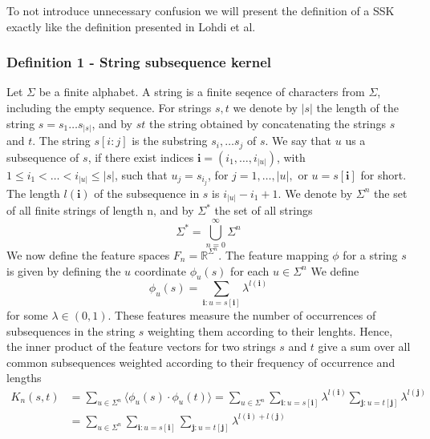 To not introduce unnecessary confusion we will present the definition of a SSK exactly like the definition presented in Lohdi et al. 

\subsubsection*{Definition 1 - String subsequence kernel}
Let $ \Sigma $ be a finite alphabet. A string is a finite seqence of characters from $ \Sigma $, including the empty sequence. For strings $s,t$ we denote by $|s|$ the length of the string $ s = s_1 \dots s_{|s|} $, and by $ st $ the string obtained by concatenating the strings $ s $ and $ t $. The string $ s[i:j] $ is the substring $ s_i, \dots s_j $ of $ s $. We say that $ u $ us a subsequence of $ s $, if there exist indices $ \boldsymbol{i} = (i_1, \dots, i_{|u|}) $, with $ 1 \leq i_1 < \dots < i_{|u|} \leq |s| $, such that $ u_j = s_{i_{j}}$, for $ j = 1, \dots, |u|, $ or $ u = s[\boldsymbol{i}] $ for short. The length $ l(\boldsymbol{i}) $ of the subsequence in $ s $ is $ i_{|u|} - i_1 +1 $. We denote by $ \Sigma^n $ the set of all finite strings of length n, and by $ \Sigma^* $ the set of all strings 
\begin{equation}\label{eq:all_Strings}
\Sigma^* = \bigcup^{\infty}_{n=0}\Sigma^n
\end{equation}
We now define the feature spaces $ F_n = \mathbb{R}^{\Sigma^{n}} $. The feature mapping $ \phi $ for a string $ s $ is given by defining the $ u $ coordinate $ \phi_u(s) $ for each $u \in \Sigma^n  $ We define 
\begin{equation}
\phi_u(s) = \sum_{\boldsymbol{i}:u=s[\boldsymbol{i}]} \lambda^{l(\boldsymbol{i})}
\end{equation}
for some $ \lambda \in (0,1) $. These features measure the number of occurrences of subsequences in the string $ s $ weighting them according to their lenghts. Hence, the inner product of the feature vectors for two strings $ s $ and $ t $ give a sum over all common subsequences weighted according to their frequency of occurrence and lengths
\begin{align*}\label{key}
K_n(s,t) &= \sum_{u\in\Sigma^n} \langle \phi_u(s) \cdot \phi_u(t) \rangle = \sum_{u \in \Sigma^n} \sum_{\boldsymbol{i}:u=s[\boldsymbol{i}]} \lambda^{l(\boldsymbol{i})} \sum_{\boldsymbol{j}:u=t[\boldsymbol{j}]} \lambda^{l(\boldsymbol{j})} \\
& =  \sum_{u \in \Sigma^n} \sum_{\boldsymbol{i}:u=s[\boldsymbol{i}]}  \sum_{\boldsymbol{j}:u=t[\boldsymbol{j}]} \lambda^{l(\boldsymbol{i}) + l(\boldsymbol{j})}
\end{align*}


